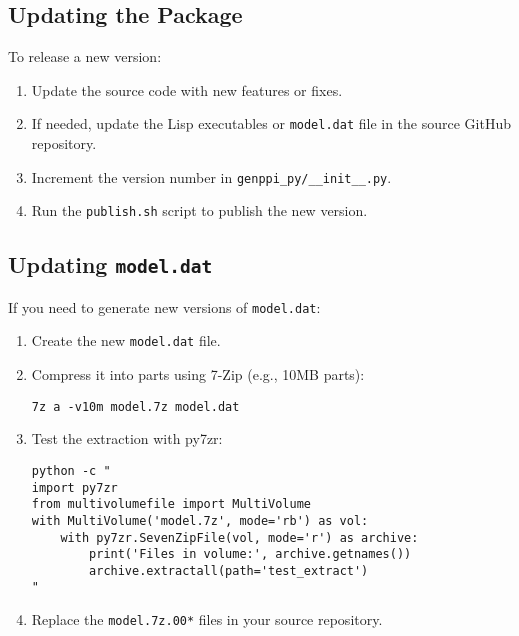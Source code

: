\documentclass[11pt, a4paper]{article}
\begin{document}
\subsection{Updating the Package}
To release a new version:
\begin{enumerate}
    \item Update the source code with new features or fixes.
    \item If needed, update the Lisp executables or \texttt{model.dat} file in the source GitHub repository.
    \item Increment the version number in \texttt{genppi\_py/\_\_init\_\_.py}.
    \item Run the \texttt{publish.sh} script to publish the new version.
\end{enumerate}

\subsection{Updating \texttt{model.dat}}
If you need to generate new versions of \texttt{model.dat}:
\begin{enumerate}
    \item Create the new \texttt{model.dat} file.
    \item Compress it into parts using 7-Zip (e.g., 10MB parts):
    \begin{lstlisting}[style=bashstyle]
7z a -v10m model.7z model.dat
    \end{lstlisting}
    \item Test the extraction with py7zr:
    \begin{lstlisting}[style=bashstyle]
python -c "
import py7zr
from multivolumefile import MultiVolume
with MultiVolume('model.7z', mode='rb') as vol:
    with py7zr.SevenZipFile(vol, mode='r') as archive:
        print('Files in volume:', archive.getnames())
        archive.extractall(path='test_extract')
"
    \end{lstlisting}
    \item Replace the \texttt{model.7z.00*} files in your source repository.
\end{enumerate}
\end{document}
